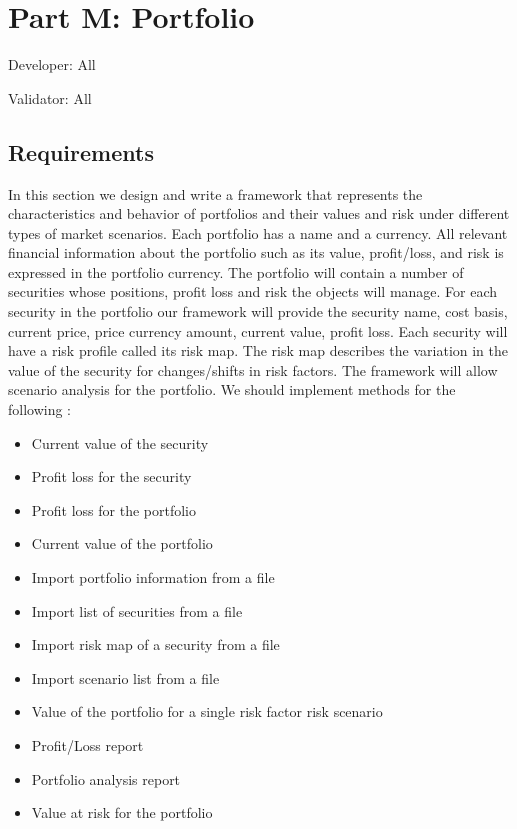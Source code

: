 \chapter{Part M: Portfolio}
Developer: All

\noindent Validator: All



\section{Requirements}

In this section we design and write a framework that represents the characteristics and behavior
 of portfolios and their values and risk under different types of market scenarios. Each portfolio 
has a name and a currency. All relevant financial information about the portfolio such as its value, 
profit/loss, and risk is expressed in the portfolio currency. The portfolio will contain a number of securities 
whose positions, profit loss and risk the objects will manage. For each security in the portfolio our framework will 
provide the security name, cost basis, current price, price currency amount, current value, profit loss.
Each security will have a risk profile called its risk map. The risk map describes the variation in the value of the 
security for changes/shifts in risk factors. The framework will allow scenario analysis for the portfolio. We should implement methods for the following :
\begin{itemize}
	\item Current value of the security
	\item Profit loss for the security
	\item Profit loss for the portfolio
	\item Current value of the portfolio
	\item Import portfolio information from a file
	\item Import list of securities from a file
	\item Import risk map of a security from a file
	\item Import scenario list from a file
	\item Value of the portfolio for a single risk factor risk scenario
	\item Profit/Loss report
	\item Portfolio analysis report
	\item Value at risk for the portfolio
\end{itemize}

